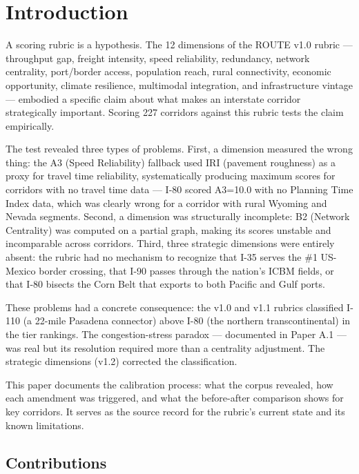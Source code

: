 \section{Introduction}

A scoring rubric is a hypothesis. The 12 dimensions of the ROUTE v1.0 rubric --- throughput gap, freight intensity, speed reliability, redundancy, network centrality, port/border access, population reach, rural connectivity, economic opportunity, climate resilience, multimodal integration, and infrastructure vintage --- embodied a specific claim about what makes an interstate corridor strategically important. Scoring 227 corridors against this rubric tests the claim empirically.

The test revealed three types of problems. First, a dimension measured the wrong thing: the A3 (Speed Reliability) fallback used IRI (pavement roughness) as a proxy for travel time reliability, systematically producing maximum scores for corridors with no travel time data --- I-80 scored A3=10.0 with no Planning Time Index data, which was clearly wrong for a corridor with rural Wyoming and Nevada segments. Second, a dimension was structurally incomplete: B2 (Network Centrality) was computed on a partial graph, making its scores unstable and incomparable across corridors. Third, three strategic dimensions were entirely absent: the rubric had no mechanism to recognize that I-35 serves the \#1 US-Mexico border crossing, that I-90 passes through the nation's ICBM fields, or that I-80 bisects the Corn Belt that exports to both Pacific and Gulf ports.

These problems had a concrete consequence: the v1.0 and v1.1 rubrics classified I-110 (a 22-mile Pasadena connector) above I-80 (the northern transcontinental) in the tier rankings. The congestion-stress paradox --- documented in Paper A.1 --- was real but its resolution required more than a centrality adjustment. The strategic dimensions (v1.2) corrected the classification.

This paper documents the calibration process: what the corpus revealed, how each amendment was triggered, and what the before-after comparison shows for key corridors. It serves as the source record for the rubric's current state and its known limitations.

\subsection*{Contributions}

